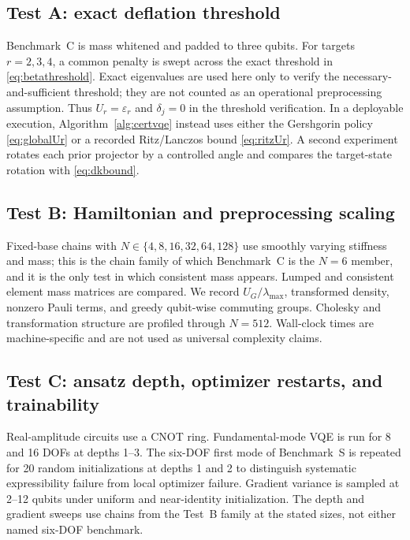 \documentclass{ieeeaccess}
\begin{document}
\subsection{Test A: exact deflation threshold}

Benchmark~C is mass whitened and padded to three qubits. For targets $r=2,3,4$, a common penalty is swept across the exact threshold in \cref{eq:betathreshold}. Exact eigenvalues are used here only to verify the necessary-and-sufficient threshold; they are not counted as an operational preprocessing assumption. Thus $U_r=\varepsilon_r$ and $\delta_j=0$ in the threshold verification. In a deployable execution, Algorithm~\ref{alg:certvqe} instead uses either the Gershgorin policy \cref{eq:globalUr} or a recorded Ritz/Lanczos bound \cref{eq:ritzUr}. A second experiment rotates each prior projector by a controlled angle and compares the target-state rotation with \cref{eq:dkbound}.

\subsection{Test B: Hamiltonian and preprocessing scaling}

Fixed-base chains with $N\in\{4,8,16,32,64,128\}$ use smoothly varying stiffness and mass; this is the chain family of which Benchmark~C is the $N=6$ member, and it is the only test in which consistent mass appears. Lumped and consistent element mass matrices are compared. We record $U_G/\lambda_{\max}$, transformed density, nonzero Pauli terms, and greedy qubit-wise commuting groups. Cholesky and transformation structure are profiled through $N=512$. Wall-clock times are machine-specific and are not used as universal complexity claims.

\subsection{Test C: ansatz depth, optimizer restarts, and trainability}

Real-amplitude circuits use a CNOT ring. Fundamental-mode VQE is run for 8 and 16 DOFs at depths 1--3. The six-DOF first mode of Benchmark~S is repeated for 20 random initializations at depths 1 and 2 to distinguish systematic expressibility failure from local optimizer failure. Gradient variance is sampled at 2--12 qubits under uniform and near-identity initialization. The depth and gradient sweeps use chains from the Test~B family at the stated sizes, not either named six-DOF benchmark.
\end{document}

